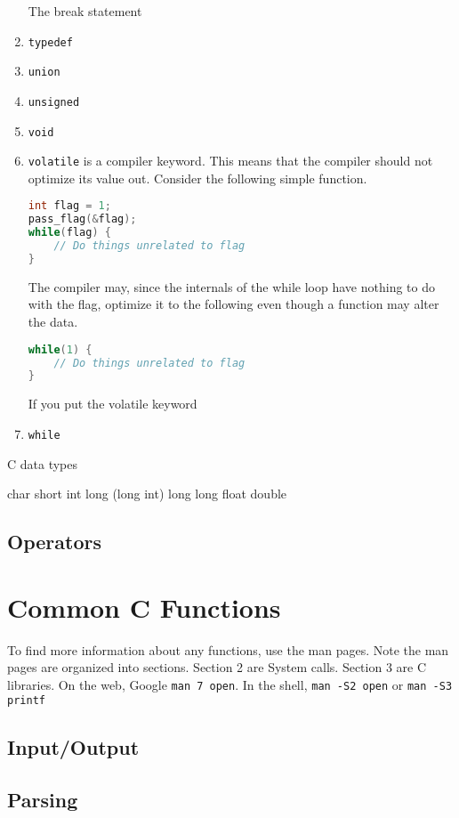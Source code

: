 \begin{enumerate}
The break statement
\item \texttt{typedef}
\item \texttt{union}
\item \texttt{unsigned}
\item \texttt{void}
\item \texttt{volatile} is a compiler keyword. This means that the compiler should not optimize its value out. Consider the following simple function.
\begin{lstlisting}[language=C]
int flag = 1;
pass_flag(&flag);
while(flag) {
    // Do things unrelated to flag
}
\end{lstlisting}
The compiler may, since the internals of the while loop have nothing to do with the flag, optimize it to the following even though a function may alter the data.
\begin{lstlisting}[language=C]
while(1) {
    // Do things unrelated to flag
}
\end{lstlisting}
If you put the volatile keyword
\item \texttt{while }
\end{enumerate}

C data types
\begin{enumerate}
char
short
int
long (long int)
long long
float
double
\end{enumerate}

\subsection{Operators}

\section{Common C Functions}

To find more information about any functions, use the man pages. Note the man pages are organized into sections. Section 2 are System calls. Section 3 are C libraries. On the web, Google \texttt{man 7 open}. In the shell, \texttt{man -S2 open} or \texttt{man -S3 printf}

\subsection{Input/Output}

\subsection{Parsing}

